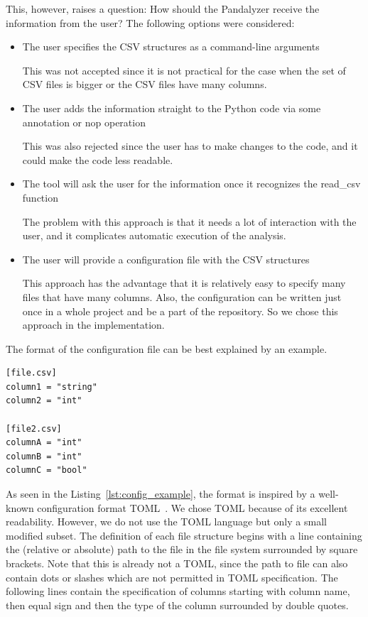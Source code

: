 This, however, raises a question: How should the Pandalyzer receive the information from the user?
The following options were considered:
\begin{itemize}
    \item The user specifies the CSV structures as a command-line arguments

    This was not accepted since it is not practical for the case when the set of CSV files is bigger or the CSV files
    have many columns.

    \item The user adds the information straight to the Python code via some annotation or nop operation

    This was also rejected since the user has to make changes to the code, and it could make the code less readable.

    \item The tool will ask the user for the information once it recognizes the read\_csv function

    The problem with this approach is that it needs a lot of interaction with the user, and it complicates automatic
    execution of the analysis.

    \item The user will provide a configuration file with the CSV structures

    This approach has the advantage that it is relatively easy to specify many files that have many columns.
    Also, the configuration can be written just once in a whole project and be a part of the repository.
    So we chose this approach in the implementation.
\end{itemize}

The format of the configuration file can be best explained by an example.

\begin{lstlisting}[caption=An example configuration file, label={lst:config_example}, captionpos=b]
[file.csv]
column1 = "string"
column2 = "int"

[file2.csv]
columnA = "int"
columnB = "int"
columnC = "bool"
\end{lstlisting}

As seen in the Listing~\ref{lst:config_example}, the format is inspired by a well-known configuration format
TOML~\cite{toml_spec}.
We chose TOML because of its excellent readability.
However, we do not use the TOML language but only a small modified subset.
The definition of each file structure begins with a line containing the (relative or absolute) path to the file in the file
system surrounded by square brackets.
Note that this is already not a TOML, since the path to file can also contain dots or slashes which are not permitted in
TOML specification.
The following lines contain the specification of columns starting with column name, then equal sign and then the type of the
column surrounded by double quotes.

